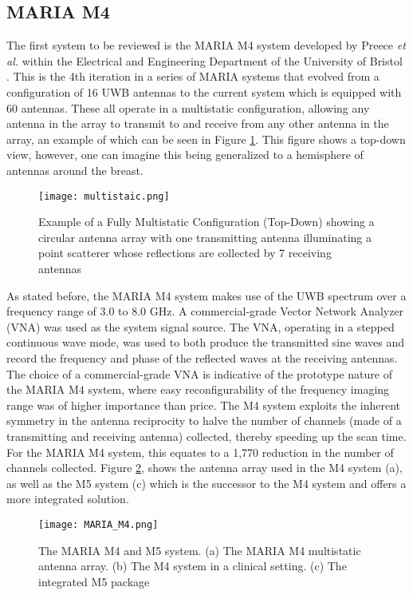 \subsection{MARIA M4}
The first system to be reviewed is the MARIA M4 system developed by Preece \textit{et al.} within the Electrical and Engineering
Department of the University of Bristol \cite{preeceMARIAM4Clinical2016}. This is the 4th iteration in a series of MARIA
systems that evolved from a configuration of 16 UWB antennas to the current system which is equipped with 60 antennas.
These all operate in a multistatic configuration, allowing any antenna in the array to transmit to and receive from any
other antenna in the array, an example of which can be seen in Figure \ref{fig:MultistaticExample}. This figure shows a
top-down view, however, one can imagine this being generalized to a hemisphere of antennas around the breast.
\begin{figure}
    \texttt{[image: multistaic.png]}
    \centering
    \caption{Example of a Fully Multistatic Configuration (Top-Down) showing a circular antenna array with one transmitting antenna illuminating a point scatterer whose reflections are collected by 7 receiving antennas}
    \label{fig:MultistaticExample}
\end{figure}
As stated before, the MARIA M4 system makes use of the UWB spectrum over a frequency range of 3.0 to 8.0 GHz. A
commercial-grade Vector Network Analyzer (VNA) was used as the system signal source. The VNA, operating in a stepped
continuous wave mode, was used to both produce the transmitted sine waves and record the frequency and phase of the
reflected waves at the receiving antennas. The choice of a commercial-grade VNA is indicative of the prototype nature of
the MARIA M4 system, where easy reconfigurability of the frequency imaging range was of higher importance than price.
The M4 system exploits the inherent symmetry in the antenna reciprocity to halve the number of channels (made of a
transmitting and receiving antenna) collected, thereby speeding up the scan time. For the MARIA M4 system, this equates
to a 1,770 reduction in the number of channels collected. Figure \ref{fig:MARIAM4}, shows the antenna array used in the
M4 system (a), as well as the M5 system (c) which is the successor to the M4 system and offers a more integrated solution.
\begin{figure}
    \texttt{[image: MARIA\_M4.png]}
    \centering
    \caption{The MARIA M4 and M5 system. (a) The MARIA M4 multistatic antenna array. (b) The M4 system in a clinical setting. (c) The integrated M5 package \cite{preeceMARIAM4Clinical2016}}
    \label{fig:MARIAM4}
\end{figure}
